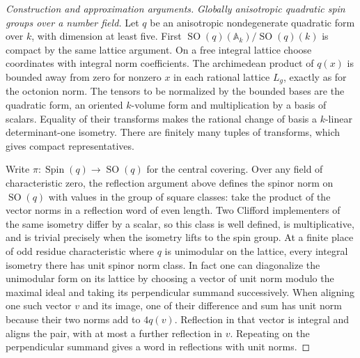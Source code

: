 \documentclass[11pt,a4paper,openany,oneside]{book}
\theoremstyle{resultstyle}
\theoremstyle{definition}
\numberwithin{equation}{chapter}
\begin{document}
\begin{proof}[Construction and approximation arguments]
\medskip\noindent
\textit{Globally anisotropic quadratic spin groups over a number field.}
Let \(q\) be an anisotropic nondegenerate quadratic form over
\(k\), with dimension at least five. First
\(\operatorname{SO}(q)(\mathbb A_k)/\operatorname{SO}(q)(k)\)
is compact by the same lattice argument. On a free integral
lattice choose coordinates with integral norm coefficients.
The archimedean product of \(q(x)\) is bounded away from zero
for nonzero \(x\) in each rational lattice \(L_g\), exactly
as for the octonion norm. The tensors to be normalized by the
bounded bases are the quadratic form, an oriented \(k\)-volume
form and multiplication by a basis of scalars. Equality
of their transforms makes the rational change of basis a
\(k\)-linear determinant-one isometry. There are finitely many
tuples of transforms, which gives compact representatives.

Write \(\pi:\operatorname{Spin}(q)\to\operatorname{SO}(q)\)
for the central covering. Over any field of characteristic
zero, the reflection argument above defines the spinor norm
on \(\operatorname{SO}(q)\) with values in the group of
square classes: take the product of the vector norms in
a reflection word of even length. Two Clifford implementers
of the same isometry differ by a scalar, so this class is
well defined, is multiplicative, and is trivial precisely
when the isometry lifts to the spin group. At a finite place
of odd residue characteristic where \(q\) is unimodular on
the lattice, every integral isometry there has unit spinor
norm class. In fact one can diagonalize the unimodular
form on its lattice by choosing a vector of unit norm
modulo the maximal ideal and taking its perpendicular
summand successively. When aligning one such vector \(v\)
and its image, one of their difference and sum has unit
norm because their two norms add to \(4q(v)\). Reflection in
that vector is integral and aligns the pair, with at most a
further reflection in \(v\). Repeating on the perpendicular
summand gives a word in reflections with unit norms.


\end{proof}
\end{document}
